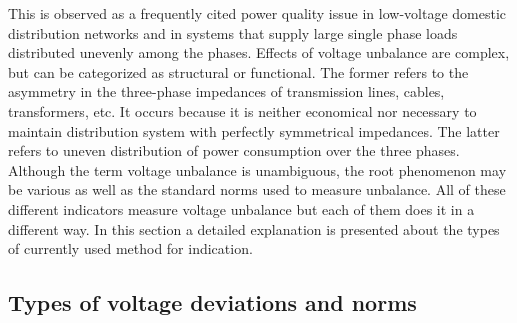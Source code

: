 	This is observed as a frequently cited power quality issue in low-voltage domestic distribution networks and in systems that supply large single phase loads distributed unevenly among the phases. Effects of voltage unbalance are complex, but can be categorized as structural or functional. The former refers to the asymmetry in the three-phase impedances of transmission lines, cables, transformers, etc. It occurs because it is neither economical nor necessary to maintain distribution system with perfectly symmetrical impedances. The latter refers to uneven distribution of power consumption over the three phases. Although the term voltage unbalance is unambiguous, the root phenomenon may be various as well as the standard norms used to measure unbalance. All of these different indicators measure voltage unbalance but each of them does it in a different way. In this section a detailed explanation is presented about the types of currently used method for indication.
	
	\subsection{Types of voltage deviations and norms}\label{BASICUNB:sec:DefinitionsofUNB}

